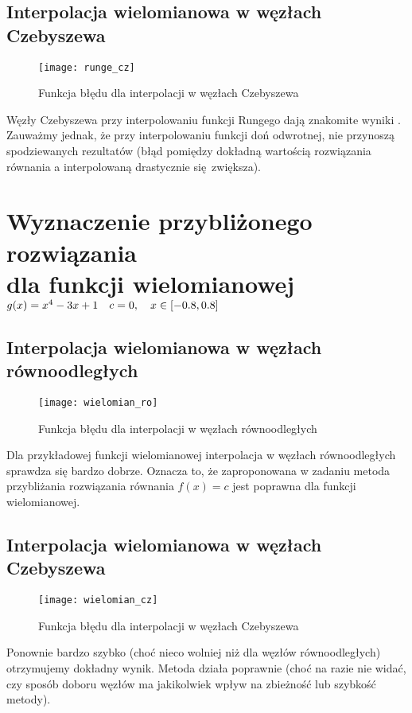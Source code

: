 \documentclass{article}
\begin{document}
\clearpage

\subsection{Interpolacja wielomianowa w węzłach Czebyszewa}
\begin{figure}[ht]
	\begin{center}
		\texttt{[image: runge\_cz]}
	\end{center}
	\caption{Funkcja błędu dla interpolacji w węzłach Czebyszewa}
	\label{fig:5}
\end{figure}
\indent Węzły Czebyszewa przy interpolowaniu funkcji Rungego dają znakomite wyniki \cite{runge}. Zauważmy jednak, że przy interpolowaniu funkcji doń odwrotnej, nie przynoszą spodziewanych
rezultatów (błąd pomiędzy dokładną wartością rozwiązania równania a interpolowaną drastycznie się zwiększa).

\clearpage

\section{Wyznaczenie przybliżonego rozwiązania \\ dla funkcji wielomianowej $ g(x) = x^4 - 3x + 1 \\ \quad c = 0, \quad x \in [-0.8,0.8] $}
\subsection{Interpolacja wielomianowa w węzłach równoodległych}
\begin{figure}[ht]
	\begin{center}
		\texttt{[image: wielomian\_ro]}
	\end{center}
	\caption{Funkcja błędu dla interpolacji w węzłach równoodległych}
	\label{fig:5}
\end{figure}
\indent Dla przykładowej funkcji wielomianowej interpolacja w węzłach równoodległych sprawdza się bardzo dobrze. Oznacza to, że zaproponowana w zadaniu metoda przybliżania rozwiązania równania $ f(x) = c $ jest poprawna
dla funkcji wielomianowej.

\clearpage

\subsection{Interpolacja wielomianowa w węzłach Czebyszewa}
\begin{figure}[ht]
	\begin{center}
		\texttt{[image: wielomian\_cz]}
	\end{center}
	\caption{Funkcja błędu dla interpolacji w węzłach Czebyszewa}
	\label{fig:5}
\end{figure}
\indent Ponownie bardzo szybko (choć nieco wolniej niż dla węzłów równoodległych) otrzymujemy dokładny wynik. Metoda działa poprawnie (choć na razie nie widać, czy sposób doboru węzłów ma jakikolwiek wpływ na zbieżność lub szybkość metody).
\end{document}
